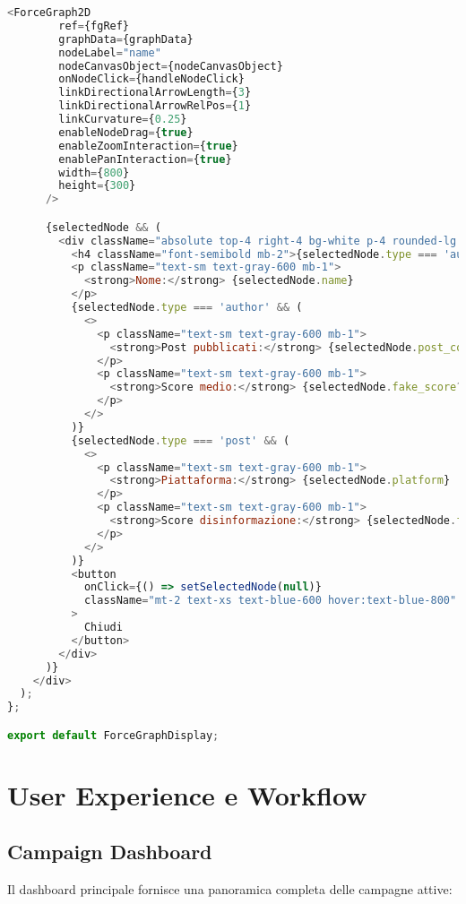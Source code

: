 \documentclass[12pt,a4paper]{report}
\begin{document}
\begin{lstlisting}[language=JavaScript, caption=ForceGraphDisplay.jsx]
      <ForceGraph2D
        ref={fgRef}
        graphData={graphData}
        nodeLabel="name"
        nodeCanvasObject={nodeCanvasObject}
        onNodeClick={handleNodeClick}
        linkDirectionalArrowLength={3}
        linkDirectionalArrowRelPos={1}
        linkCurvature={0.25}
        enableNodeDrag={true}
        enableZoomInteraction={true}
        enablePanInteraction={true}
        width={800}
        height={300}
      />

      {selectedNode && (
        <div className="absolute top-4 right-4 bg-white p-4 rounded-lg shadow-lg border max-w-xs">
          <h4 className="font-semibold mb-2">{selectedNode.type === 'author' ? 'Autore' : 'Post'}</h4>
          <p className="text-sm text-gray-600 mb-1">
            <strong>Nome:</strong> {selectedNode.name}
          </p>
          {selectedNode.type === 'author' && (
            <>
              <p className="text-sm text-gray-600 mb-1">
                <strong>Post pubblicati:</strong> {selectedNode.post_count}
              </p>
              <p className="text-sm text-gray-600 mb-1">
                <strong>Score medio:</strong> {selectedNode.fake_score?.toFixed(1)}
              </p>
            </>
          )}
          {selectedNode.type === 'post' && (
            <>
              <p className="text-sm text-gray-600 mb-1">
                <strong>Piattaforma:</strong> {selectedNode.platform}
              </p>
              <p className="text-sm text-gray-600 mb-1">
                <strong>Score disinformazione:</strong> {selectedNode.fake_score}
              </p>
            </>
          )}
          <button
            onClick={() => setSelectedNode(null)}
            className="mt-2 text-xs text-blue-600 hover:text-blue-800"
          >
            Chiudi
          </button>
        </div>
      )}
    </div>
  );
};

export default ForceGraphDisplay;
\end{lstlisting}

\section{User Experience e Workflow}

\subsection{Campaign Dashboard}

Il dashboard principale fornisce una panoramica completa delle campagne attive:
\end{document}
